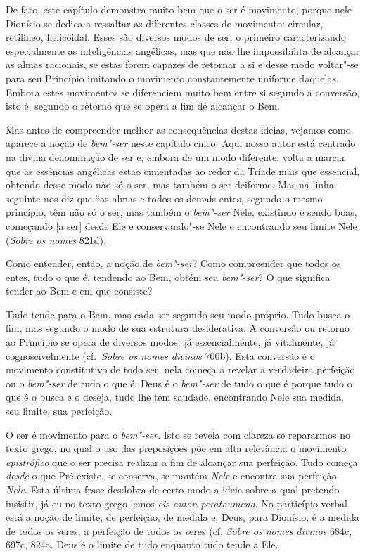 De fato, este capítulo demonstra muito bem que o ser é movimento, porque nele
Dionísio se dedica a ressaltar as diferentes classes de movimento: circular,
retilíneo, helicoidal. Esses são diversos modos de ser, o primeiro
caracterizando especialmente as inteligências angélicas, mas que não lhe
impossibilita de alcançar as almas racionais, se estas forem capazes de retornar
a si e desse modo voltar"-se para seu Princípio imitando o movimento
constantemente uniforme daquelas. Embora estes movimentos se diferenciem muito
bem entre si segundo a conversão, isto é, segundo o retorno que se opera a fim
de alcançar o Bem. 

Mas antes de compreender melhor as consequências destas ideias, vejamos como
aparece a noção de \textit{bem"-ser} neste capítulo cinco. Aqui nosso autor está
centrado na divina denominação de ser e, embora de um modo diferente, volta a
marcar que as essências angélicas estão cimentadas ao redor da Tríade mais que
essencial, obtendo desse modo não só o ser, mas também o ser deiforme. Mas na 
linha seguinte nos diz que ``as almas e todos os demais entes, segundo o mesmo
princípio, têm não só o ser, mas também o \textit{bem"-ser} Nele, existindo e
sendo boas, começando [a ser] desde Ele e conservando"-se Nele e encontrando seu
limite Nele (\textit{Sobre os nomes} 821d).

Como entender, então, a noção de \textit{bem"-ser}? Como compreender que todos os
entes, tudo o que é, tendendo ao Bem, obtém seu \textit{bem"-ser}? O que
significa tender ao Bem e em que consiste?

Tudo tende para o Bem, mas cada ser segundo seu modo próprio. Tudo busca o fim,
mas segundo o modo de sua estrutura desiderativa. A conversão ou retorno ao
Princípio se opera de diversos modos: já essencialmente, já vitalmente, já
cognoscivelmente (cf.~\textit{Sobre os nomes divinos} 700b). Esta conversão 
é o movimento constitutivo de todo ser, nela começa a revelar a verdadeira
perfeição ou o \textit{bem"-ser} de tudo o que é. Deus é o \textit{bem"-ser} de
tudo o que é porque tudo o que é o busca e o deseja, tudo lhe tem saudade,
encontrando Nele sua medida, seu limite, sua perfeição. 

O ser é movimento para o \textit{bem"-ser}. Isto se revela com clareza se
repararmos no texto grego, no qual o uso das preposições põe em alta relevância
o movimento \textit{epistrófico} que o ser precisa realizar a fim de alcançar
sua perfeição. Tudo começa \textit{desde} o que Pré-existe, se conserva, se
mantém \textit{Nele} e encontra sua perfeição \textit{Nele}. Esta última frase
desdobra de certo modo a ideia sobre a qual pretendo insistir, já eu no texto
grego lemos \textit{eis auton peratoumena}. No particípio verbal está a noção de
limite, de perfeição, de medida e, Deus, para Dionísio, é a medida de todos os
seres, a perfeição de todos os seres (cf. \textit{Sobre os nomes divinos} 684c,
697c, 824a. Deus é o limite de tudo enquanto tudo tende a Ele. 

